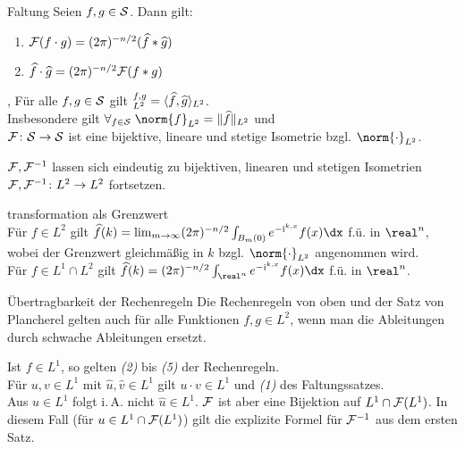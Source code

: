 \begin{Satz}{Faltung}
    Seien $f, g \in \S$.
    Dann gilt:
    \begin{enumerate}
        \item
        $\F(f \cdot g) = (2\pi)^{-n/2} (\widehat{f} \ast \widehat{g})$

        \item
        $\widehat{f} \cdot \widehat{g} = (2\pi)^{-n/2} \F(f \ast g)$
    \end{enumerate}
\end{Satz}

\linie

\begin{Satz}{, }
    Für alle $f, g \in \S$ gilt $\sp{f, g}_{L^2} =
    \langle\widehat{f}, \widehat{g}\rangle_{L^2}$.\\
    Insbesondere gilt $\forall_{f \in \S}\; \norm{f}_{L^2} = \Vert\widehat{f}\Vert_{L^2}$ und\\
    $\F\colon \S \rightarrow \S$ ist eine bijektive, lineare und stetige Isometrie
    bzgl. $\norm{\cdot}_{L^2}$.
\end{Satz}

\begin{Kor}
    $\F, \F^{-1}$ lassen sich eindeutig zu bijektiven, linearen und stetigen Isometrien\\
    $\F, \F^{-1}\colon L^2 \rightarrow L^2$ fortsetzen.
\end{Kor}

\linie
\pagebreak

\begin{Satz}{transformation als Grenzwert}\\
    Für $f \in L^2$ gilt
    $\widehat{f}(k) = \lim_{m \to \infty} (2\pi)^{-n/2} \int_{B_m(0)} e^{-\iu\sp{k,x}}f(x)\dx$
    f.ü. in $\real^n$, wobei der Grenzwert gleichmäßig in $k$ bzgl. $\norm{\cdot}_{L^2}$
    angenommen wird.\\
    Für $f \in L^1 \cap L^2$ gilt
    $\widehat{f}(k) = (2\pi)^{-n/2} \int_{\real^n} e^{-\iu\sp{k,x}}f(x)\dx$ f.ü. in $\real^n$.
\end{Satz}

\begin{Satz}{Übertragbarkeit der Rechenregeln}
    Die Rechenregeln von oben und der Satz von Plancherel gelten auch für alle Funktionen
    $f, g \in L^2$, wenn man die Ableitungen durch schwache Ableitungen ersetzt.
\end{Satz}

\begin{Bem}
    Ist $f \in L^1$, so gelten \emph{(2)} bis \emph{(5)} der Rechenregeln.\\
    Für $u, v \in L^1$ mit $\widehat{u}, \widehat{v} \in L^1$ gilt $u \cdot v \in L^1$ und
    \emph{(1)} des Faltungssatzes.\\
    Aus $u \in L^1$ folgt i.\,A. nicht $\widehat{u} \in L^1$.
    $\F$ ist aber eine Bijektion auf $L^1 \cap \F(L^1)$.
    In diesem Fall (für $u \in L^1 \cap \F(L^1)$)
    gilt die explizite Formel für $\F^{-1}$ aus dem ersten Satz.
\end{Bem}

